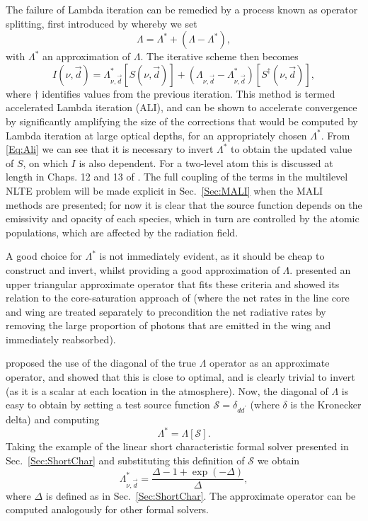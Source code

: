 The failure of Lambda iteration can be remedied by a process known as operator splitting, first introduced by \citet{Cannon1973} whereby we set
\begin{equation}
    \Lambda = \Lambda^* + (\Lambda - \Lambda^*),
\end{equation}
with $\Lambda^*$ an approximation of $\Lambda$. The iterative scheme then becomes
\begin{equation}
    I(\nu, \vec{d}) = \Lambda_{\nu, \vec{d}}^*[S(\nu, \vec{d})] + (\Lambda_{\nu, \vec{d}} - \Lambda_{\nu, \vec{d}}^*)[S^{\dagger}(\nu, \vec{d})],
    \label{Eq:Ali}
\end{equation}
where $\dagger$ identifies values from the previous iteration. This method is termed accelerated Lambda iteration (ALI), and can be shown to accelerate convergence by significantly amplifying the size of the corrections that would be computed by Lambda iteration at large optical depths, for an appropriately chosen $\Lambda^*$.
From \eqref{Eq:Ali} we can see that it is necessary to invert $\Lambda^*$ to obtain the updated value of $S$, on which $I$ is also dependent.
For a two-level atom this is discussed at length in Chaps. 12 and 13 of \citet{Hubeny2014}.
The full coupling of the terms in the multilevel NLTE problem will be made explicit in Sec.~\ref{Sec:MALI} when the MALI methods are presented; for now it is clear that the source function depends on the emissivity and opacity of each species, which in turn are controlled by the atomic populations, which are affected by the radiation field.

A good choice for $\Lambda^*$ is not immediately evident, as it should be cheap to construct and invert, whilst providing a good approximation of $\Lambda$.
\citet{Scharmer1981} presented an upper triangular approximate operator that fits these criteria and showed its relation to the core-saturation approach of \citet{Rybicki1972} (where the net rates in the line core and wing are treated separately to precondition the net radiative rates by removing the large proportion of photons that are emitted in the wing and immediately reabsorbed).

\citet{Olson1986} proposed the use of the diagonal of the true $\Lambda$ operator as an approximate operator, and showed that this is close to optimal, and is clearly trivial to invert (as it is a scalar at each location in the atmosphere).
Now, the diagonal of $\Lambda$ is easy to obtain by setting a test source function $\mathcal{S}=\delta_{dd^\prime}$ (where $\delta$ is the Kronecker delta) and computing
\begin{equation}
    \Lambda^* = \Lambda[\mathcal{S}].
\end{equation}
Taking the example of the linear short characteristic formal solver presented in Sec.~\ref{Sec:ShortChar} and substituting this definition of $\mathcal{S}$ we obtain
\begin{equation}
    \Lambda^*_{\nu, \vec{d}} = \frac{\Delta - 1 + \exp(-\Delta)}{\Delta},
\end{equation}
where $\Delta$ is defined as in Sec.~\ref{Sec:ShortChar}.
The approximate operator can be computed analogously for other formal solvers.


